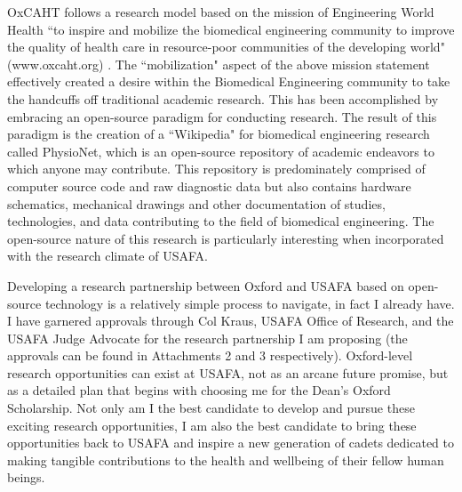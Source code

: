 \documentclass{article}
\begin{document}
OxCAHT follows a research model based on the mission of Engineering World
Health ``to inspire and mobilize the biomedical engineering community to improve
the quality of health care in resource-poor communities of the developing
world" (www.oxcaht.org) . The ``mobilization" aspect of the above mission
statement effectively created a desire within the Biomedical Engineering 
community to take the handcuffs off traditional academic research. This has
been accomplished by embracing an open-source paradigm for conducting research.
The result of this paradigm is the creation of a ``Wikipedia" for biomedical
engineering research called PhysioNet, which is an open-source repository of
academic endeavors to which anyone may contribute. This repository is
predominately comprised of computer source code and raw diagnostic data but
also contains hardware schematics, mechanical drawings and other documentation
of studies, technologies, and data contributing to the field of biomedical
engineering. The open-source nature of this research is particularly
interesting when incorporated with the research climate of USAFA.
 
Developing a research partnership between Oxford and USAFA based on open-source
technology is a relatively simple process to navigate, in fact I already have.
I have garnered approvals through Col Kraus, USAFA Office of Research, and the
USAFA Judge Advocate for the research partnership I am proposing (the
approvals can be found in Attachments 2 and 3
respectively). Oxford-level research opportunities can
exist at USAFA, not as an arcane future promise, but as a detailed plan that
begins with choosing me for the Dean's Oxford Scholarship. Not only am I the
best candidate to develop and pursue these exciting research opportunities, I
am also the best candidate to bring these opportunities back to USAFA and
inspire a new generation of cadets dedicated to making tangible contributions
to the health and wellbeing of their fellow human beings.
\end{document}
